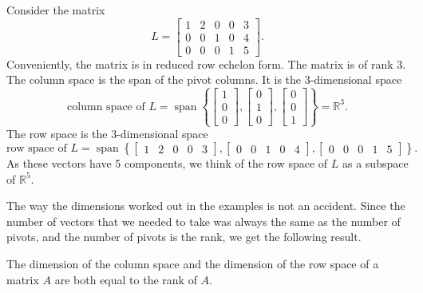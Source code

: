 \begin{example}
Consider the matrix
\begin{equation*}
L =
\begin{bmatrix}
{1} & 2 & 0 & 0 & 3 \\
0 & 0 & {1} & 0 & 4 \\
0 & 0 & 0 & {1} & 5
\end{bmatrix} .
\end{equation*}
Conveniently, the matrix is in reduced row echelon form.
The matrix is of rank 3.
The column space is the span of the pivot columns.
It is the 3-dimensional space
\begin{equation*}
\text{column space of $L$} =
\operatorname{span} \left\{
\begin{bmatrix}
1 \\
0 \\
0
\end{bmatrix}
,
\begin{bmatrix}
0 \\
1 \\
0
\end{bmatrix}
,
\begin{bmatrix}
0 \\
0 \\
1
\end{bmatrix}
\right\}
= {\mathbb{R}}^3 .
\end{equation*}
The row space is the 3-dimensional space
\begin{equation*}
\text{row space of $L$} =
\operatorname{span} \left\{
\begin{bmatrix}
1 & 2 & 0 & 0 & 3
\end{bmatrix}
,
\begin{bmatrix}
0 & 0 & 1 & 0 & 4
\end{bmatrix}
,
\begin{bmatrix}
0 & 0 & 0 & 1 & 5
\end{bmatrix}
\right\} .
\end{equation*}
As these vectors have 5 components, we think of the row space of $L$
as a subspace of ${\mathbb{R}}^5$.
\end{example}

The way the dimensions worked out in the examples is not
an accident.  Since the number of vectors that we needed to take
was always the same as the number of pivots, and the number of pivots
is the rank, we get the following result.

\begin{theorem}[Rank]
The dimension of the column space and the dimension of the row space
of a matrix $A$ are both equal to the rank of $A$.
\end{theorem}


